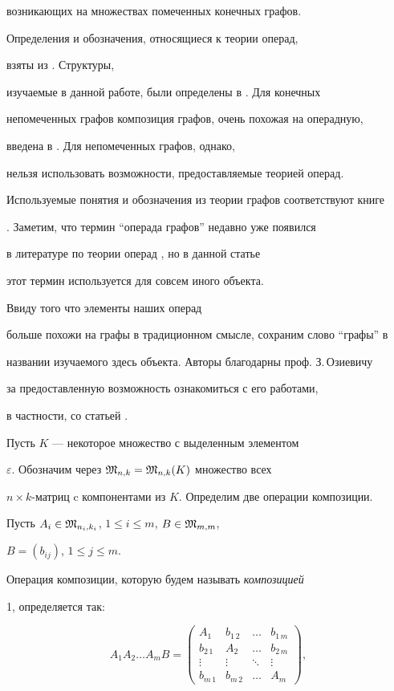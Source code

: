 возникающих на множествах помеченных конечных графов.


Определения и обозначения, относящиеся к теории операд,


взяты из \cite{TK}. Структуры,


изучаемые в данной работе, были определены в \cite{T}. Для конечных


непомеченных графов композиция графов, очень похожая на операдную,


введена в \cite{LM}. Для непомеченных графов, однако,


нельзя использовать возможности, предоставляемые теорией операд.


Используемые понятия и обозначения из теории графов соответствуют книге


\cite{H}. Заметим, что термин ``операда графов'' недавно уже появился


в литературе по теории операд \cite{Oz}, но  в данной статье


этот термин используется для совсем иного объекта.


Ввиду того что элементы наших операд


больше похожи на графы в традиционном смысле, сохраним слово ``графы'' в


названии изучаемого здесь объекта. Авторы благодарны проф. З.\,Озиевичу


за предоставленную возможность ознакомиться с его работами,


в частности, со статьей \cite{Oz}.








Пусть $K$ --- некоторое множество с выделенным элементом


$\varepsilon$. Обозначим через ${\frak M}_{n,k}={\frak M}_{n,k}(K)$ множество всех


$n\times k$-матриц c компонентами из $K$. Определим две операции композиции.


Пусть $A_i\in {\frak M}_{n_i,k_i}$, $1\leq i\leq m$, $B\in {\frak M}_{m,m}$,


$B=(b_{ij})$, $1\leq j\leq m$.


Операция композиции, которую будем называть {\it композицией}


1, определяется так:


\begin{equation}


A_1 A_2 \dotsc A_m B=


\begin{pmatrix}


A_1 & b_{1\,2} & \dotsc & b_{1\,m} \\


b_{2\,1} & A_2 & \dotsc & b_{2\, m} \\


\vdots & \vdots  & \ddots & \vdots \\


b_{m\,1} & b_{m\,2} & \dotsc & A_m 


\end{pmatrix}


,


\end{equation}


